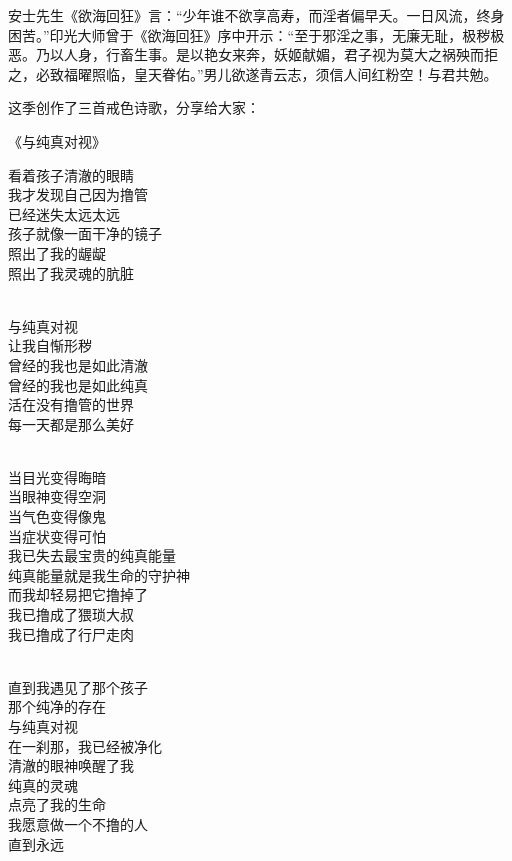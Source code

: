 \documentclass{ctexart}
\begin{document}
安士先生《欲海回狂》言：“少年谁不欲享高寿，而淫者偏早夭。一日风流，终身困苦。”印光大师曾于《欲海回狂》序中开示：“至于邪淫之事，无廉无耻，极秽极恶。乃以人身，行畜生事。是以艳女来奔，妖姬献媚，君子视为莫大之祸殃而拒之，必致福曜照临，皇天眷佑。”男儿欲遂青云志，须信人间红粉空！与君共勉。

这季创作了三首戒色诗歌，分享给大家：

\begin{center}
    《与纯真对视》\it
    \begin{multicols}{2}
        看着孩子清澈的眼睛 \\ 我才发现自己因为撸管 \\ 已经迷失太远太远 \\ 孩子就像一面干净的镜子 \\ 照出了我的龌龊 \\ 照出了我灵魂的肮脏

        ~\\

        与纯真对视 \\ 让我自惭形秽 \\ 曾经的我也是如此清澈 \\ 曾经的我也是如此纯真 \\ 活在没有撸管的世界 \\ 每一天都是那么美好

        ~\\

        当目光变得晦暗 \\ 当眼神变得空洞 \\ 当气色变得像鬼 \\ 当症状变得可怕 \\ 我已失去最宝贵的纯真能量 \\ 纯真能量就是我生命的守护神 \\ 而我却轻易把它撸掉了 \\ 我已撸成了猥琐大叔 \\ 我已撸成了行尸走肉

        ~\\

        直到我遇见了那个孩子 \\ 那个纯净的存在 \\ 与纯真对视 \\ 在一刹那，我已经被净化 \\ 清澈的眼神唤醒了我 \\ 纯真的灵魂 \\ 点亮了我的生命 \\ 我愿意做一个不撸的人 \\ 直到永远
    \end{multicols}
\end{center}
\end{document}
